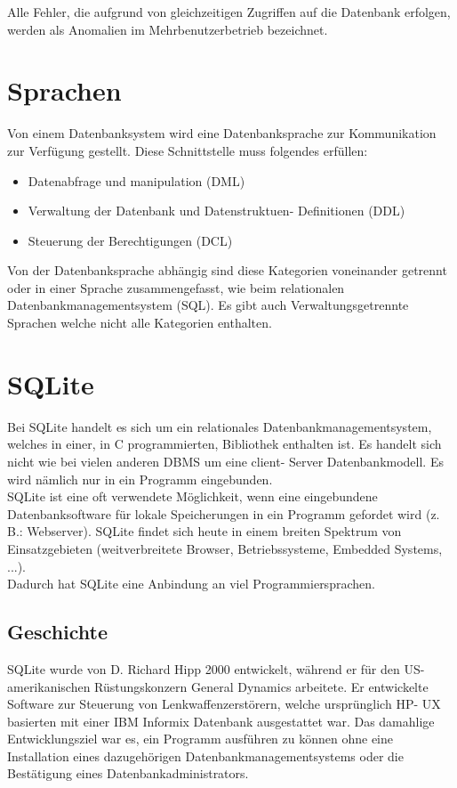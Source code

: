 \documentclass[12pt,a4paper]{report}
\begin{document}
\begin{onehalfspace}
Alle Fehler, die aufgrund von gleichzeitigen Zugriffen auf die Datenbank erfolgen, werden als Anomalien im Mehrbenutzerbetrieb bezeichnet.

\section{Sprachen}
Von einem Datenbanksystem wird eine Datenbanksprache zur Kommunikation zur Verfügung gestellt. Diese Schnittstelle muss folgendes erfüllen:
\begin{itemize}
\item Datenabfrage und manipulation (DML)
\item Verwaltung der Datenbank und Datenstruktuen- Definitionen (DDL)
\item Steuerung der Berechtigungen (DCL)
\end{itemize}
Von der Datenbanksprache abhängig sind diese Kategorien voneinander getrennt oder in einer Sprache zusammengefasst, wie beim relationalen Datenbankmanagementsystem (SQL). Es gibt auch Verwaltungsgetrennte Sprachen welche nicht alle Kategorien enthalten.
\section{SQLite}
Bei SQLite handelt es sich um ein relationales Datenbankmanagementsystem, welches in einer, in C programmierten, Bibliothek enthalten ist. Es handelt sich nicht wie bei vielen anderen DBMS um eine client- Server Datenbankmodell. Es wird nämlich nur in ein Programm eingebunden.\\

SQLite ist eine oft verwendete Möglichkeit, wenn eine eingebundene Datenbanksoftware für lokale Speicherungen in ein Programm gefordet wird (z. B.: Webserver). SQLite findet sich heute in einem breiten Spektrum von Einsatzgebieten (weitverbreitete Browser, Betriebssysteme, Embedded Systems, ...).\\

Dadurch hat SQLite eine Anbindung an viel Programmiersprachen.

\subsection{Geschichte}
SQLite wurde von D. Richard Hipp 2000 entwickelt, während er für den US- amerikanischen Rüstungskonzern General Dynamics arbeitete. Er entwickelte Software zur Steuerung von Lenkwaffenzerstörern, welche ursprünglich HP- UX basierten mit einer IBM Informix Datenbank ausgestattet war. Das damahlige Entwicklungsziel war es, ein Programm ausführen zu können ohne eine Installation eines dazugehörigen Datenbankmanagementsystems oder die Bestätigung eines Datenbankadministrators.\\


\end{onehalfspace}
\end{document}
